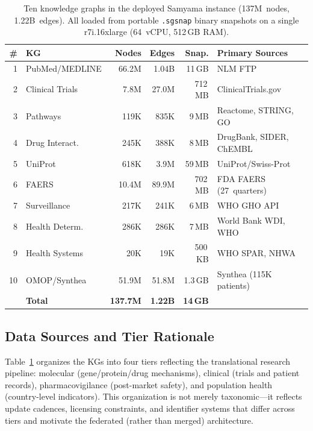 \documentclass[runningheads]{llncs}
\begin{document}
\begin{table}[t]
\centering
\caption{Ten knowledge graphs in the deployed Samyama instance
  (137M~nodes, 1.22B~edges).  All loaded from portable
  \texttt{.sgsnap} binary snapshots on a single r7i.16xlarge
  (64~vCPU, 512\,GB RAM).}
\label{tab:kgs}
\small
\begin{tabular}{@{}rlrrrl@{}}
\toprule
\textbf{\#} & \textbf{KG} & \textbf{Nodes} & \textbf{Edges}
  & \textbf{Snap.} & \textbf{Primary Sources} \\
\midrule
1 & PubMed/MEDLINE   & 66.2M & 1.04B  & 11\,GB  & NLM FTP \\
2 & Clinical Trials  &  7.8M & 27.0M  & 712\,MB & ClinicalTrials.gov \\
3 & Pathways         &  119K &  835K  & 9\,MB   & Reactome, STRING, GO \\
4 & Drug Interact.   &  245K &  388K  & 8\,MB   & DrugBank, SIDER, ChEMBL \\
5 & UniProt          &  618K &  3.9M  & 59\,MB  & UniProt/Swiss-Prot \\
6 & FAERS            & 10.4M & 89.9M  & 702\,MB & FDA FAERS (27~quarters) \\
7 & Surveillance     &  217K &  241K  & 6\,MB   & WHO GHO API \\
8 & Health Determ.   &  286K &  286K  & 7\,MB   & World Bank WDI, WHO \\
9 & Health Systems   &   20K &   19K  & 500\,KB & WHO SPAR, NHWA \\
10 & OMOP/Synthea    & 51.9M & 51.8M  & 1.3\,GB & Synthea (115K patients) \\
\midrule
   & \textbf{Total}  & \textbf{137.7M} & \textbf{1.22B}
     & \textbf{14\,GB} & \\
\bottomrule
\end{tabular}
\end{table}

\subsection{Data Sources and Tier Rationale}

Table~\ref{tab:kgs} organizes the KGs into four tiers reflecting
the translational research pipeline: molecular (gene/protein/drug
mechanisms), clinical (trials and patient records),
pharmacovigilance (post-market safety), and population health
(country-level indicators).  This organization is not merely
taxonomic---it reflects update cadences, licensing constraints,
and identifier systems that differ across tiers and motivate the
federated (rather than merged) architecture.
\end{document}

